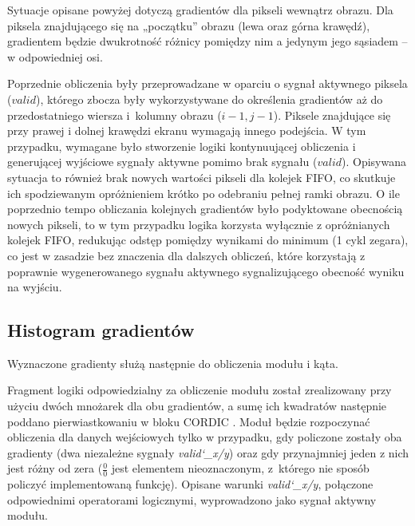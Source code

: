 Sytuacje opisane powyżej dotyczą gradientów dla pikseli wewnątrz obrazu. 
Dla piksela znajdującego się na „początku” obrazu (lewa oraz górna krawędź), gradientem będzie dwukrotność różnicy pomiędzy nim a jedynym jego sąsiadem -- w odpowiedniej osi. %

Poprzednie obliczenia były przeprowadzane w oparciu o sygnał aktywnego piksela ($valid$), którego zbocza były wykorzystywane do określenia gradientów aż do przedostatniego wiersza i~kolumny obrazu ($i-1, j-1$).
Piksele znajdujące się przy prawej i dolnej krawędzi ekranu wymagają innego podejścia. 
W tym przypadku, wymagane było stworzenie logiki kontynuującej obliczenia i generującej wyjściowe sygnały aktywne pomimo brak sygnału ($valid$). 
Opisywana sytuacja to również brak nowych wartości pikseli dla kolejek FIFO, co skutkuje ich spodziewanym opróżnieniem krótko po odebraniu pełnej ramki obrazu.
O ile poprzednio tempo obliczania kolejnych gradientów było podyktowane obecnością nowych pikseli, to w tym przypadku logika korzysta wyłącznie z opróżnianych kolejek FIFO, redukując odstęp pomiędzy wynikami do minimum (1 cykl zegara), co jest w zasadzie bez znaczenia dla dalszych obliczeń, które korzystają z poprawnie wygenerowanego sygnału aktywnego sygnalizującego obecność wyniku na wyjściu.


\subsection{Histogram gradientów}


Wyznaczone gradienty służą następnie do obliczenia modułu i kąta. 

Fragment logiki odpowiedzialny za obliczenie modułu został zrealizowany przy użyciu dwóch mnożarek dla obu gradientów, a sumę ich kwadratów następnie poddano pierwiastkowaniu w bloku CORDIC \cite{CORDIC}. 
Moduł będzie rozpoczynać obliczenia dla danych wejściowych tylko w przypadku, gdy policzone zostały oba gradienty (dwa niezależne sygnały \textit{valid\char`_x/y}) oraz gdy przynajmniej jeden z nich jest różny od zera ($\frac{0}{0}$ jest elementem nieoznaczonym, z~którego nie sposób policzyć implementowaną funkcję). 
Opisane warunki \textit{valid\char`_x/y}, połączone odpowiednimi operatorami logicznymi, wyprowadzono jako sygnał aktywny modułu. 

